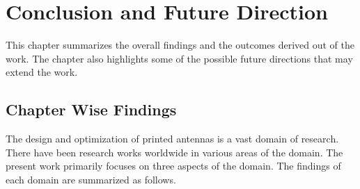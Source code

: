 \chapter{Conclusion and Future Direction}
\label{chap:chap6}
This chapter summarizes the overall findings and the outcomes derived out of the work. The chapter also highlights some of the possible future directions that may extend the work.

\section{Chapter Wise Findings}\label{c6sec_findings}
The design and optimization of printed antennas is a vast domain of research. There have been research works worldwide in various areas of the domain. The present work primarily focuses on three  aspects of the domain. The findings of each domain are summarized as follows.
